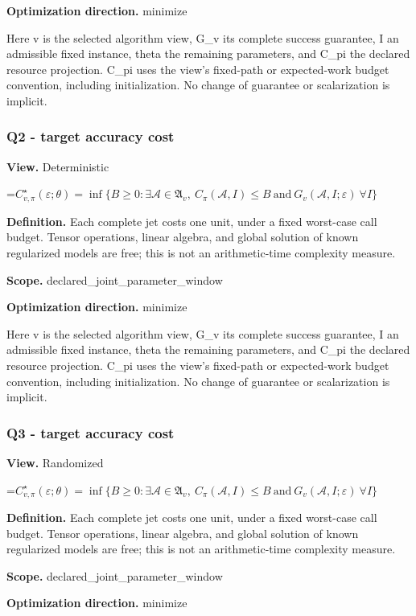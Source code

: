 \documentclass[10pt,a4paper]{article}
\newcommand{\AtlasMath}[1]{\par\begingroup\centering\setbox0=\hbox{$\displaystyle #1$}\ifdim\wd0>1.4\linewidth\typeout{ATLAS WIDE FORMULA: \the\wd0}\fi\ifdim\wd0>\linewidth\resizebox{\linewidth}{!}{\box0}\else\box0\fi\par\endgroup}
\begin{document}
\textbf{Optimization direction.} minimize

Here v is the selected algorithm view, G\_v its complete success guarantee, I an admissible fixed instance, theta the remaining parameters, and C\_pi the declared resource projection. C\_pi uses the view's fixed-path or expected-work budget convention, including initialization. No change of guarantee or scalarization is implicit.

\subsubsection{Q2 - target accuracy cost}
\textbf{View.} Deterministic

\AtlasMath{C^\star_{v,\pi}(\varepsilon;\theta)=\inf\{B\ge0:\exists\mathcal A\in\mathfrak A_v,\ C_\pi(\mathcal A,I)\le B\ \text{and}\ G_v(\mathcal A,I;\varepsilon)\ \forall I\}}
\textbf{Definition.} Each complete jet costs one unit, under a fixed worst-case call budget. Tensor operations, linear algebra, and global solution of known regularized models are free; this is not an arithmetic-time complexity measure.

\textbf{Scope.} declared\_joint\_parameter\_window

\textbf{Optimization direction.} minimize

Here v is the selected algorithm view, G\_v its complete success guarantee, I an admissible fixed instance, theta the remaining parameters, and C\_pi the declared resource projection. C\_pi uses the view's fixed-path or expected-work budget convention, including initialization. No change of guarantee or scalarization is implicit.

\subsubsection{Q3 - target accuracy cost}
\textbf{View.} Randomized

\AtlasMath{C^\star_{v,\pi}(\varepsilon;\theta)=\inf\{B\ge0:\exists\mathcal A\in\mathfrak A_v,\ C_\pi(\mathcal A,I)\le B\ \text{and}\ G_v(\mathcal A,I;\varepsilon)\ \forall I\}}
\textbf{Definition.} Each complete jet costs one unit, under a fixed worst-case call budget. Tensor operations, linear algebra, and global solution of known regularized models are free; this is not an arithmetic-time complexity measure.

\textbf{Scope.} declared\_joint\_parameter\_window

\textbf{Optimization direction.} minimize
\end{document}
